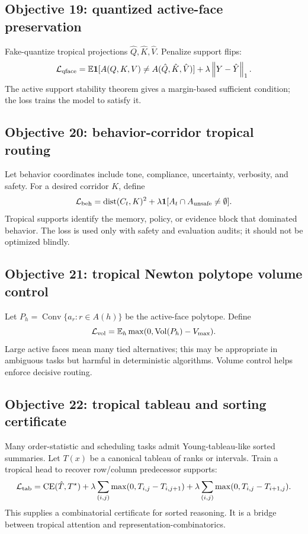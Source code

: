 \documentclass[11pt]{article}
\newcommand{\E}{\mathbb{E}}
\newcommand{\calL}{\mathcal{L}}
\newcommand{\Conv}{\operatorname{Conv}}
\newcommand{\norm}[1]{\left\lVert #1\right\rVert}
\begin{document}
\subsection{Objective 19: quantized active-face preservation}

Fake-quantize tropical projections \(\hat Q,\hat K,\hat V\).  Penalize support flips:
\begin{equation}
\calL_{\rm qface}=\E\mathbf{1}[A(Q,K,V)\ne A(\hat Q,\hat K,\hat V)]+\lambda\norm{Y-\hat Y}_1.
\end{equation}
The active support stability theorem gives a margin-based sufficient condition; the loss trains the model to satisfy it.

\subsection{Objective 20: behavior-corridor tropical routing}

Let behavior coordinates include tone, compliance, uncertainty, verbosity, and safety.  For a desired corridor \(K\), define
\begin{equation}
\calL_{\rm beh}=\operatorname{dist}(C_t,K)^2+\lambda\mathbf{1}[A_t\cap A_{\rm unsafe}\ne\emptyset].
\end{equation}
Tropical supports identify the memory, policy, or evidence block that dominated behavior.  The loss is used only with safety and evaluation audits; it should not be optimized blindly.

\subsection{Objective 21: tropical Newton polytope volume control}

Let \(P_h=\Conv\{a_r:r\in A(h)\}\) be the active-face polytope.  Define
\begin{equation}
\calL_{\rm vol}=\E_h \max(0,\operatorname{Vol}(P_h)-V_{\max}).
\end{equation}
Large active faces mean many tied alternatives; this may be appropriate in ambiguous tasks but harmful in deterministic algorithms.  Volume control helps enforce decisive routing.

\subsection{Objective 22: tropical tableau and sorting certificate}

Many order-statistic and scheduling tasks admit Young-tableau-like sorted summaries.  Let \(T(x)\) be a canonical tableau of ranks or intervals.  Train a tropical head to recover row/column predecessor supports:
\begin{equation}
\calL_{\rm tab}=\operatorname{CE}(\hat T,T^\star)+\lambda\sum_{(i,j)}\max(0,T_{i,j}-T_{i,j+1})+\lambda\sum_{(i,j)}\max(0,T_{i,j}-T_{i+1,j}).
\end{equation}
This supplies a combinatorial certificate for sorted reasoning.  It is a bridge between tropical attention and representation-combinatorics.
\end{document}
